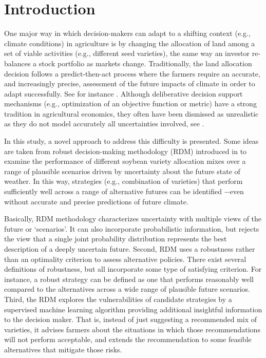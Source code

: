 \documentclass[syngen,nonblindrev]{informs3-syngen}
\begin{document}
\section{Introduction}
One major way in which decision-makers can adapt to a shifting context (e.g., climate conditions) in agriculture is by changing the allocation of land among a set of viable activities (e.g., different seed varieties), the same way an investor re-balances a stock portfolio as markets change. 
Traditionally, the land allocation decision follows a predict-then-act process where the farmers require an accurate, and increasingly precise, assessment of the future impacts of climate in order to adapt successfully. 
See for instance \cite{messina1999land}.
Although deliberative decision support mechanisms (e.g., optimization of an objective function or metric) have a strong tradition in agricultural economics, they often have been dismissed as unrealistic as they do not model accurately all uncertainties involved, see \cite{rivera2011recognising}. \par
In this study, a novel approach to address this difficulty is presented. 
Some ideas are taken from robust decision-making methodology (RDM) introduced in \cite{lempert2003shaping} to examine the performance of different soybean variety allocation mixes over a range of plausible scenarios driven by uncertainty about the future state of weather. 
In this way, strategies (e.g., combination of varieties) that perform sufficiently well across a range of alternative futures can be identified −even without accurate and precise predictions of future climate.\par
Basically, RDM methodology characterizes uncertainty with multiple views of the future or ‘scenarios’. 
It can also incorporate probabilistic information, but rejects the view that a single joint probability distribution represents the best description of a deeply uncertain future. 
Second, RDM uses a robustness rather than an optimality criterion to assess alternative policies. 
There exist several definitions of robustness, but all incorporate some type of satisfying criterion. 
For instance, a robust strategy can be defined as one that performs reasonably well compared to the alternatives across a wide range of plausible future scenarios. 
Third, the RDM explores the vulnerabilities of candidate strategies by a supervised machine learning algorithm providing additional insightful information to the decision maker. 
That is, instead of just suggesting a recommended mix of varieties, it advises farmers about the situations in which those recommendations will not perform acceptable, and extends the recommendation to some feasible alternatives that mitigate those risks. \par
\end{document}
